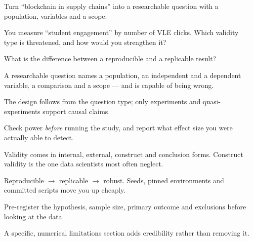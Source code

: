 \begin{checkpoint}
\begin{tightnum}
  \item Turn ``blockchain in supply chains'' into a researchable question with a
        population, variables and a scope.
  \item You measure ``student engagement'' by number of VLE clicks. Which validity
        type is threatened, and how would you strengthen it?
  \item What is the difference between a reproducible and a replicable result?
\end{tightnum}
\end{checkpoint}

\begin{chaptersummary}
\begin{tight}
  \item A researchable question names a population, an independent and a dependent
        variable, a comparison and a scope --- and is capable of being wrong.
  \item The design follows from the question type; only experiments and
        quasi-experiments support causal claims.
  \item Check power \emph{before} running the study, and report what effect size you
        were actually able to detect.
  \item Validity comes in internal, external, construct and conclusion forms.
        Construct validity is the one data scientists most often neglect.
  \item Reproducible $\rightarrow$ replicable $\rightarrow$ robust. Seeds, pinned
        environments and committed scripts move you up cheaply.
  \item Pre-register the hypothesis, sample size, primary outcome and exclusions
        before looking at the data.
  \item A specific, numerical limitations section adds credibility rather than
        removing it.
\end{tight}
\end{chaptersummary}

